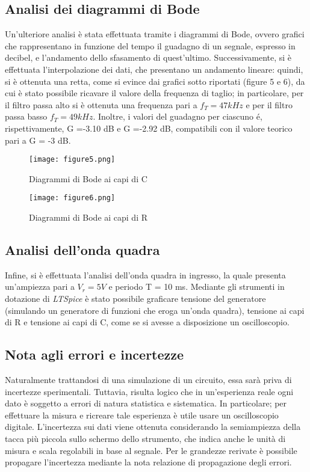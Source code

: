 \documentclass{article}
\begin{document}
\subsection{Analisi dei diagrammi di Bode}
Un’ulteriore analisi è stata effettuata tramite i diagrammi di Bode, ovvero grafici
che rappresentano in funzione del tempo il guadagno di un segnale, espresso in decibel, e l’andamento
dello sfasamento di quest’ultimo. Successivamente,
si è effettuata l'interpolazione dei dati, che presentano un andamento
lineare: quindi, si è ottenuta una retta, come si evince dai grafici sotto riportati
(figure 5 e 6), da cui è stato possibile ricavare il valore della frequenza
di taglio; in particolare, per il filtro passa alto si è ottenuta una frequenza
pari a $f_T = 47 kHz$ e per il filtro passa basso $f_T= 49 kHz$. Inoltre, i valori
del guadagno per ciascuno é, rispettivamente, G =-3.10 dB e G =-2.92 dB,
compatibili con il valore teorico pari a G = -3 dB.
\begin{figure}[h!]
    \centering
    \texttt{[image: figure5.png]}
    \caption{Diagrammi di Bode ai capi di C}
    \label{figura5}
\end{figure}
\begin{figure}[h!]
    \centering
    \texttt{[image: figure6.png]}
    \caption{Diagrammi di Bode ai capi di R}
    \label{figura6}
\end{figure}
\subsection{Analisi dell'onda quadra}
Infine, si è effettuata l’analisi dell’onda quadra in ingresso, la quale presenta
un’ampiezza pari a $V_r = 5 V$ e periodo T = 10 ms. Mediante gli strumenti in
dotazione di \emph{LTSpice} è stato possibile graficare tensione del generatore (simulando
un generatore di funzioni che eroga un’onda quadra), tensione ai capi di
R e tensione ai capi di C, come se si avesse a disposizione un oscilloscopio.
\subsection{Nota agli errori e incertezze}
Naturalmente trattandosi di una simulazione di un circuito, essa sarà priva di incertezze sperimentali. Tuttavia, risulta logico che in un’esperienza
reale ogni dato è soggetto a errori di natura statistica e sistematica. In particolare;
per effettuare la misura e ricreare tale esperienza è utile usare un oscilloscopio
digitale. L’incertezza sui dati viene ottenuta considerando la semiampiezza della
tacca più piccola sullo schermo dello strumento, che indica anche le unità di
misura e scala regolabili in base al segnale. Per le grandezze rerivate è possibile
propagare l’incertezza mediante la nota relazione di propagazione degli errori.
\end{document}
